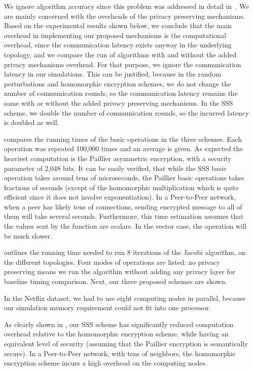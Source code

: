 \documentclass[10pt]{svjour3}
\begin{document}
We ignore algorithm accuracy since this problem was addressed in
detail in~\cite{KorenCF}. We are mainly concerned with the
overheads of the privacy preserving mechanisms. Based on the
experimental results shown below, we conclude that the main
overhead in implementing our proposed mechanisms is the
computational overhead, since the communication latency exists
anyway in the underlying topology, and we compare the run of
algorithms with and without the added privacy mechanisms overhead.
For that purpose, we ignore the communication latency in our
simulations. This can be justified, because in the random
perturbations and homomorphic encryption schemes, we do not change
the number of communication rounds, so the communication latency
remains the same with or without the added privacy preserving
mechanisms. In the SSS scheme, we double the number of
communication rounds, so the incurred latency is doubled as well.

 compares the running times of the basic operations in the
three schemes. Each operation was repeated 100,000 times and an
average is given. As expected the heaviest computation is the
Paillier asymmetric encryption, with a security parameter of 2,048
bits. It can be easily verified, that while the SSS basic
operation takes around tens of microseconds, the Paillier basic
operations takes fractions of seconds (except of the homomorphic
multiplication which is quite efficient since it does not involve
exponentiation). In a Peer-to-Peer network, when a peer has likely
tens of connections, sending encrypted message to all of them will
take several seconds. Furthermore, this time estimation assumes
that the values sent by the function are scalars. In the vector
case, the operation will be much slower.

 outlines the running time needed to run 8 iterations of
the Jacobi algorithm, on the different topologies. Four modes of
operations are listed: no privacy preserving means we run the
algorithm without adding any privacy layer for baseline timing
comparison. Next, our three proposed schemes are shown.

In the Netflix dataset, we had to use eight computing nodes in
parallel, because our simulation memory requirement could not fit
into one processor.

As clearly shown in , our SSS scheme has significantly
reduced computation overhead relative to the homomorphic
encryption scheme, while having an equivalent level of security
(assuming that the Paillier encryption is semantically secure). In
a Peer-to-Peer network, with tens of neighbors, the homomorphic
encryption scheme incurs a high overhead on the computing nodes.
\end{document}
